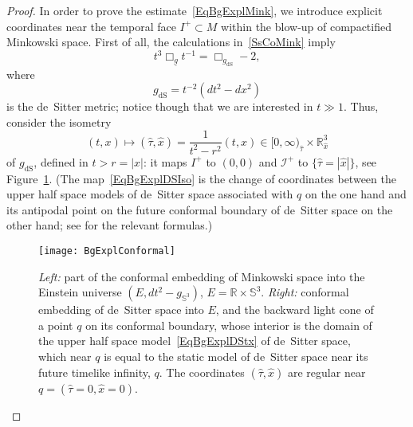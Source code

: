 \documentclass[reqno,11pt,letterpaper]{amsart}
\numberwithin{equation}{section}
\numberwithin{figure}{section}
\theoremstyle{definition}
\theoremstyle{remark}
\newcommand{\ms}{\mathscr}
\newcommand{\scri}{\ms I}
\newcommand{\R}{\mathbb{R}}
\newcommand{\Sph}{\mathbb{S}}
\newcommand{\dS}{{\mathrm{dS}}}
\newcommand{\ul}[1]{\underline{#1}{}}
\begin{document}
\begin{proof}
  In order to prove the estimate~\eqref{EqBgExplMink}, we introduce explicit coordinates near the temporal face $I^+\subset M$ within the blow-up of compactified Minkowski space. First of all, the calculations in~\ref{SsCoMink} imply
  \begin{equation}
  \label{EqBgExplDS}
    t^3\Box_{\ul g}t^{-1}=\Box_{g_\dS}-2,
  \end{equation}
  where
  \begin{equation}
  \label{EqBgExplDStx}
    g_\dS=t^{-2}(dt^2-dx^2)
  \end{equation}
  is the de~Sitter metric; notice though that we are interested in $t\gg 1$. Thus, consider the isometry
  \begin{equation}
  \label{EqBgExplDSIso}
    (t,x)\mapsto (\hat\tau,\hat x)=\frac{1}{t^2-r^2}(t,x)\in[0,\infty)_{\hat\tau}\times\R^3_{\hat x}
  \end{equation}
  of $g_\dS$, defined in $t>r=|x|$: it maps $I^+$ to $(0,0)$ and $\scri^+$ to $\{\hat\tau=|\hat x|\}$, see Figure~\ref{FigBgExplConformal}. (The map~\eqref{EqBgExplDSIso} is the change of coordinates between the upper half space models of de~Sitter space associated with $q$ on the one hand and its antipodal point on the future conformal boundary of de~Sitter space on the other hand; see \cite[\S6.1]{HintzZworskiHypObs} for the relevant formulas.)

  \begin{figure}[!ht]
  \texttt{[image: BgExplConformal]}
  \caption{\textit{Left:} part of the conformal embedding of Minkowski space into the Einstein universe $(E,dt^2-g_{\Sph^3})$, $E=\R\times\Sph^3$. \textit{Right:} conformal embedding of de~Sitter space into $E$, and the backward light cone of a point $q$ on its conformal boundary, whose interior is the domain of the upper half space model~\eqref{EqBgExplDStx} of de~Sitter space, which near $q$ is equal to the static model of de~Sitter space near its future timelike infinity, $q$. The coordinates $(\hat\tau,\hat x)$ are regular near $q=(\hat\tau=0,\hat x=0)$.}
  \label{FigBgExplConformal}
  \end{figure}


\end{proof}
\end{document}
